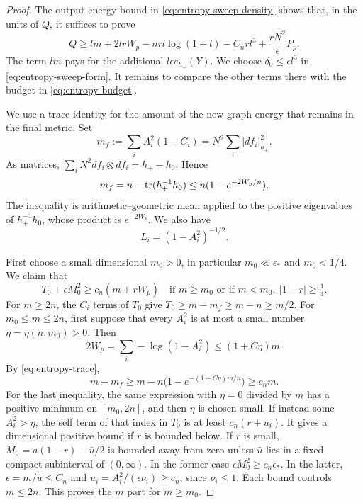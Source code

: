 \begin{proof}
The output energy bound in \eqref{eq:entropy-sweep-density} shows that,
in the units of \(Q\), it suffices to prove
\begin{equation}\label{eq:entropy-budget}
 Q\geq lm+2lrW_p-nrl\log(1+l)-C_nr l^3
             +\frac{rN^2}{\epsilon}P_p .
\end{equation}
The term \(lm\) pays for the additional \(l\epsilon e_{h_+}(Y)\).
We choose \(\delta_0\leq\epsilon l^3\) in
\eqref{eq:entropy-sweep-form}.  It remains to compare the other terms
there with the budget in \eqref{eq:entropy-budget}.

We use a trace identity for the amount of the new graph energy that
remains in the final metric.  Set
\[
 m_f:=\sum_i A_i^2(1-C_i)=N^2\sum_i|df_i|_{h_+}^2.
\]
As matrices,
\(\sum_iN^2df_i\otimes df_i=h_+-h_0\).  Hence
\begin{equation}\label{eq:entropy-trace}
 m_f=n-\operatorname{tr}(h_+^{-1}h_0)
       \leq n(1-e^{-2W_p/n}).
\end{equation}
The inequality is arithmetic--geometric mean applied to the positive
eigenvalues of \(h_+^{-1}h_0\), whose product is \(e^{-2W_p}\).
We also have
\begin{equation}\label{eq:entropy-volume-angle}
 L_i=(1-A_i^2)^{-1/2}.
\end{equation}

First choose a small dimensional \(m_0>0\), in particular
\(m_0\ll\epsilon_*\) and \(m_0<1/4\).  We claim that
\begin{equation}\label{eq:entropy-coarse-coercivity}
 T_0+\epsilon M_0^2\geq c_n(m+rW_p)
 \quad\text{if }m\geq m_0
       \text{ or if }m<m_0,\ |1-r|\geq\tfrac14.
\end{equation}
For \(m\geq2n\), the \(C_i\) terms of \(T_0\) give
\(T_0\geq m-m_f\geq m-n\geq m/2\).
For \(m_0\leq m\leq2n\), first suppose that every \(A_i^2\) is at most
a small number \(\eta=\eta(n,m_0)>0\).  Then
\[
 2W_p=\sum_i-\log(1-A_i^2)\leq(1+C\eta)m.
\]
By \eqref{eq:entropy-trace},
\[
 m-m_f\geq m-n\bigl(1-e^{-(1+C\eta)m/n}\bigr)\geq c_n m.
\]
For the last inequality, the same expression with \(\eta=0\) divided
by \(m\) has a positive minimum on \([m_0,2n]\), and then \(\eta\)
is chosen small.  If instead some \(A_i^2>\eta\), the self term of
that index in \(T_0\) is at least \(c_n(r+u_i)\).  It gives a
dimensional positive bound if \(r\) is bounded below.  If \(r\) is
small, \(M_0=a(1-r)-\bar u/2\) is bounded away from zero unless \(\bar u\)
lies in a fixed compact subinterval of \((0,\infty)\).  In the former
case \(\epsilon M_0^2\geq c_n\epsilon_*\).  In the latter,
\(\epsilon=m/\bar u\leq C_n\) and
\(u_i=A_i^2/(\epsilon\nu_i)\geq c_n\), since \(\nu_i\leq1\).
Each bound controls \(m\leq2n\).  This proves the \(m\) part for
\(m\geq m_0\).


\end{proof}

